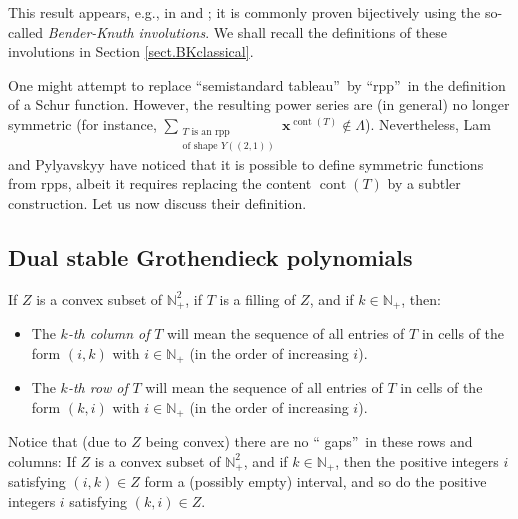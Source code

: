\documentclass[numbers=enddot,12pt,final,onecolumn,notitlepage]{scrartcl}%
\theoremstyle{definition}
\let\sumnonlimits\sum
\renewcommand{\sum}{\sumnonlimits\limits}
\begin{document}
This result appears, e.g., in \cite[Theorem 7.10.2]{Stan99} and
\cite[Proposition 2.11]{GriRei15}; it is commonly proven bijectively using the
so-called \textit{Bender-Knuth involutions}. We shall recall the definitions
of these involutions in Section \ref{sect.BKclassical}.

One might attempt to replace \textquotedblleft semistandard
tableau\textquotedblright\ by \textquotedblleft rpp\textquotedblright\ in the
definition of a Schur function. However, the resulting power series are (in
general) no longer symmetric (for instance, $\sum_{\substack{T\text{ is an
rpp}\\\text{of shape }Y\left(  \left(  2,1\right)  \right)  }}\mathbf{x}%
^{\operatorname*{cont}\left(  T\right)  }\notin\Lambda$). Nevertheless, Lam
and Pylyavskyy \cite[\S 9]{LamPyl} have noticed that it is possible to define
symmetric functions from rpps, albeit it requires replacing the content
$\operatorname*{cont}\left(  T\right)  $ by a subtler construction. Let us now
discuss their definition.

\subsection{Dual stable Grothendieck polynomials}

If $Z$ is a convex subset of $\mathbb{N}_{+}^{2}$, if $T$ is a filling of $Z$,
and if $k\in\mathbb{N}_{+}$, then:

\begin{itemize}
\item The $k$\textit{-th column of }$T$ will mean the sequence of all entries
of $T$ in cells of the form $\left(  i,k\right)  $ with $i\in\mathbb{N}_{+}$
(in the order of increasing $i$).

\item The $k$\textit{-th row of }$T$ will mean the sequence of all entries of
$T$ in cells of the form $\left(  k,i\right)  $ with $i\in\mathbb{N}_{+}$ (in
the order of increasing $i$).
\end{itemize}

Notice that (due to $Z$ being convex) there are no \textquotedblleft
gaps\textquotedblright\ in these rows and columns: If $Z$ is a convex subset
of $\mathbb{N}_{+}^{2}$, and if $k\in\mathbb{N}_{+}$, then the positive
integers $i$ satisfying $\left(  i,k\right)  \in Z$ form a (possibly empty)
interval, and so do the positive integers $i$ satisfying $\left(  k,i\right)
\in Z$.
\end{document}
